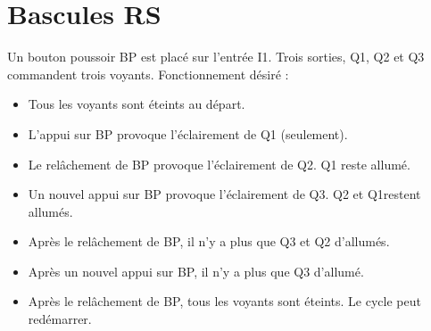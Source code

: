 \documentclass[11pt]{article}
\begin{document}
\UPSTIbuildPage


\tableofcontents

\pagebreak
\section{Bascules RS}
Un bouton poussoir BP est placé sur l’entrée I1. Trois sorties, Q1, Q2 et Q3 commandent trois
voyants. Fonctionnement désiré :

\begin{itemize}
    \item Tous les voyants sont éteints au départ.
    \item L’appui sur BP provoque l’éclairement de Q1 (seulement).
    \item Le relâchement de BP provoque l’éclairement de Q2. Q1 reste allumé.
    \item Un nouvel appui sur BP provoque l’éclairement de Q3. Q2 et Q1restent allumés.
    \item Après le relâchement de BP, il n’y a plus que Q3 et Q2 d’allumés.
    \item Après un nouvel appui sur BP, il n’y a plus que Q3 d’allumé.
    \item Après le relâchement de BP, tous les voyants sont éteints. Le cycle peut redémarrer.
\end{itemize}
\end{document}
